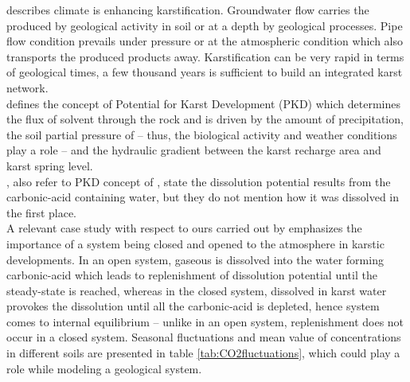 \citet{bakalowicz2005karst} describes climate is enhancing karstification. Groundwater flow carries the produced  by 
geological activity in soil or at a depth by geological processes. Pipe flow condition prevails under pressure or at the 
atmospheric condition which also transports the produced products away. Karstification can be very rapid in terms of geological 
times, a few thousand years is sufficient to build an integrated karst network.\\

\citet{mangin1975contribution} defines the concept of Potential for Karst Development (PKD) which determines the flux of solvent 
through the rock and is driven by the amount of precipitation, the soil partial pressure of  -- thus, the biological activity 
and weather conditions play a role -- and the hydraulic gradient between the karst recharge area and karst spring level. \\

\citet{mohammadi2007method}, also refer to PKD concept of \citet{mangin1975contribution}, state the dissolution potential results from 
the carbonic-acid containing water, but they do not mention how it was dissolved in the first place. \\

A relevant case study with respect to ours carried out by \citet{atkinson1977carbon} emphasizes the importance of a 
system being closed and opened to the atmosphere in karstic developments. In an open system, gaseous  is dissolved into the water 
forming carbonic-acid which leads to replenishment of dissolution potential until the steady-state 
is reached, whereas in the closed system, dissolved  in karst water provokes the dissolution until all the carbonic-acid is depleted, 
hence system comes to internal equilibrium -- unlike in an open system, replenishment does not occur in a closed system. 
Seasonal fluctuations and mean value of  concentrations in different soils are presented in table \ref{tab:CO2fluctuations}, 
which could play a role while modeling a geological system. \\


